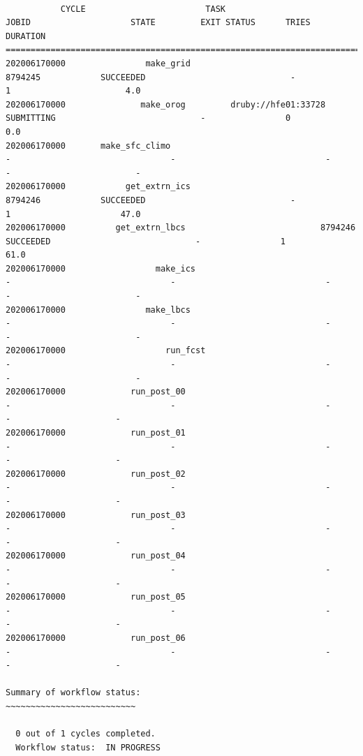 \documentclass[11pt,fleqn]{report}              %
\begin{document}
\lstset{language=bash}   
\begin{lstlisting}[frame=trBL, basicstyle=\tiny]

           CYCLE                        TASK                                JOBID                    STATE         EXIT STATUS      TRIES         DURATION
====================================================================================================
202006170000                make_grid                            8794245            SUCCEEDED                             -                1                       4.0
202006170000               make_orog         druby://hfe01:33728           SUBMITTING                             -                0                       0.0
202006170000       make_sfc_climo                                       -                                -                              -                -             	           -
202006170000            get_extrn_ics                           8794246            SUCCEEDED                             -                1                      47.0
202006170000          get_extrn_lbcs                           8794246            SUCCEEDED                             -                1                      61.0
202006170000                  make_ics                                       -                                -                              -                -              	        -
202006170000                make_lbcs                                       -                                -                              -                -                         -
202006170000                    run_fcst                                       -                                -                              -                -                         -
202006170000             run_post_00                                       -                                -                              -                -           	      -
202006170000             run_post_01                                       -                                -                              -                -            	      -
202006170000             run_post_02                                       -                                -                              -                -            	      -
202006170000             run_post_03                                       -                                -                              -                -            	      -
202006170000             run_post_04                                       -                                -                              -                -            	      -
202006170000             run_post_05                                       -                                -                              -                -            	      -
202006170000             run_post_06                                       -                                -                              -                -            	      -

Summary of workflow status:
~~~~~~~~~~~~~~~~~~~~~~~~~~

  0 out of 1 cycles completed.
  Workflow status:  IN PROGRESS

\end{lstlisting}
\end{document}
